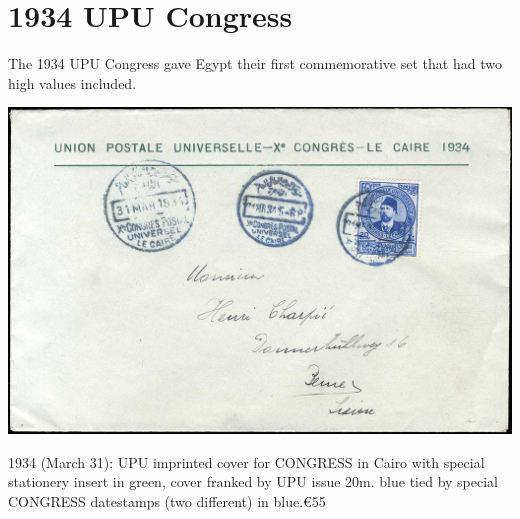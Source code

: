 \documentclass[justified]{tufte-book}
\begin{document}
\newpage

\section{1934 UPU Congress}
The 1934 UPU Congress gave Egypt their first commemorative set that had two high values included.

\medskip
\includegraphics[width=\textwidth]{./graphics/EG/UPU-cover}

1934 (March 31): UPU imprinted cover for CONGRESS in Cairo with special stationery insert in green, cover franked by UPU issue 20m. blue tied by special CONGRESS datestamps (two different) in blue.\euro55
\bigskip

\end{document}
